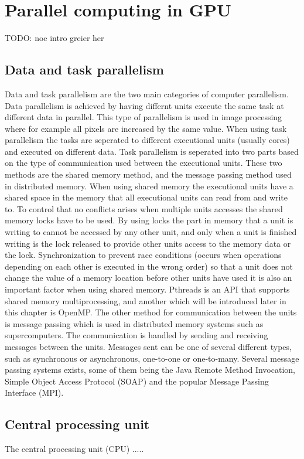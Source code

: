 \chapter{Parallel computing in GPU}
TODO: noe intro greier her

\section{Data and task parallelism}
Data and task parallelism are the two main categories of computer parallelism. Data parallelism is achieved by having differnt units execute the same task at different data in parallel. This type of parallelism is used in image processing where for example all pixels are increased by the same value. 
When using task parallelism the tasks are seperated to different executional units (usually cores) and executed on different data. Task parallelism is seperated into two parts based on the type of communication used between the executional units. These two methods are the shared memory method, and the message passing method used in distributed memory. When using shared memory the executional units have a shared space in the memory that all executional units can read from and write to. To control that no conflicts arises when multiple units accesses the shared memory locks have to be used. By using locks the part in memory that a unit is writing to cannot be accessed by any other unit, and only when a unit is finished writing is the lock released to provide other units access to the memory data or the lock. Synchronization to prevent race conditions (occurs when operations depending on each other is executed in the wrong order) so that a unit does not change the value of a memory location before other units have used it is also an important factor when using shared memory. Pthreads is an API that supports shared memory multiprocessing, and another which will be introduced later in this chapter is OpenMP. The other method for communication between the units is message passing which is used in distributed memory systems such as supercomputers. The communication is handled by sending and receiving messages between the units. Messages sent can be one of several different types, such as synchronous or asynchronous, one-to-one or one-to-many. Several message passing systems exists, some of them being the Java Remote Method Invocation, Simple Object Access Protocol (SOAP) and the popular Message Passing Interface (MPI). 

\section{Central processing unit}
The central processing unit (CPU) .....

